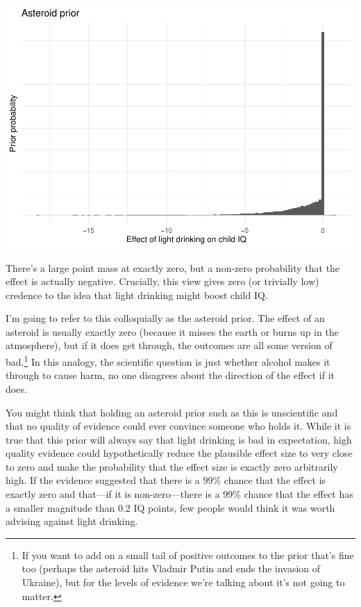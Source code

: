\documentclass[
]{article}
\begin{document}
\includegraphics{index_files/figure-latex/unnamed-chunk-1-1.pdf}

There's a large point mass at exactly zero, but a non-zero probability that the effect is actually negative. Crucially, this view gives zero (or trivially low) credence to the idea that light drinking might boost child IQ.

I'm going to refer to this colloquially as the asteroid prior. The effect of an asteroid is usually exactly zero (because it misses the earth or burns up in the atmosphere), but if it does get through, the outcomes are all some version of bad.\footnote{If you want to add on a small tail of positive outcomes to the prior that's fine too (perhaps the asteroid hits Vladmir Putin and ends the invasion of Ukraine), but for the levels of evidence we're talking about it's not going to matter.} In this analogy, the scientific question is just whether alcohol makes it through to cause harm, no one disagrees about the direction of the effect if it does.

You might think that holding an asteroid prior such as this is unscientific and that no quality of evidence could ever convince someone who holds it. While it is true that this prior will always say that light drinking is bad in expectation, high quality evidence could hypothetically reduce the plausible effect size to very close to zero and make the probability that the effect size is exactly zero arbitrarily high. If the evidence suggested that there is a 99\% chance that the effect is exactly zero and that---if it is non-zero---there is a 99\% chance that the effect has a smaller magnitude than 0.2 IQ points, few people would think it was worth advising against light drinking.
\end{document}
